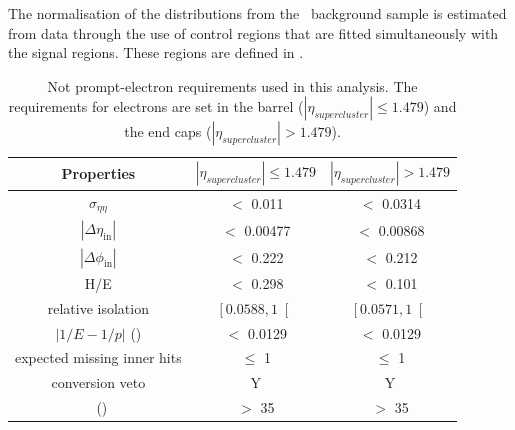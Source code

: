 The normalisation of the distributions from the \NPL\ background sample is estimated from data through the use of control regions that are fitted simultaneously with the signal regions. These regions are defined in .
\begin{table}[htbp]
	\centering
	
	\caption{Not prompt-electron requirements used in this analysis. The requirements for electrons are set in the barrel ($|\eta_{supercluster}| \leq 1.479$)
		and the end caps ($|\eta_{supercluster}| > 1.479$). }
	\begin{tabular}{ccc}
		\toprule
	 Properties	& \multicolumn{1}{c}{$|\eta_{supercluster}| \leq 1.479$ } & \multicolumn{1}{c}{$|\eta_{supercluster}| > 1.479$ } \\
		\midrule
		$\sigma_{\eta \eta}$ & $<$ 0.011 & $<$ 0.0314 \\ 
		
		$|\Delta\eta_{\mathrm{in}}|$ & $<$ 0.00477& $<$ 0.00868\\ 
		
		$|\Delta\phi_{\mathrm{in}}|$ & $<$ 0.222 &  $<$ 0.212 \\ 
		 
		H/E & $<$ 0.298& $<$ 0.101 \\ 
		
		relative isolation & $\left[ 0.0588  , 1\right[$ &  $\left[ 0.0571, 1\right[$\\ 
	
		$|1/E-1/p|$ (\GeVinv) & $<$ 0.0129  & $<$ 0.0129  \\ 
		
		expected missing inner hits & $\leq $ 1 &  $\leq $ 1\\ 
	
		 conversion veto & Y & Y \\ 
	
		\pt\ (\GeV) &$>$ 35 & $>$ 35  \\
		\bottomrule
	\end{tabular} 
	\label{tab:nonpromptel}
\end{table}

